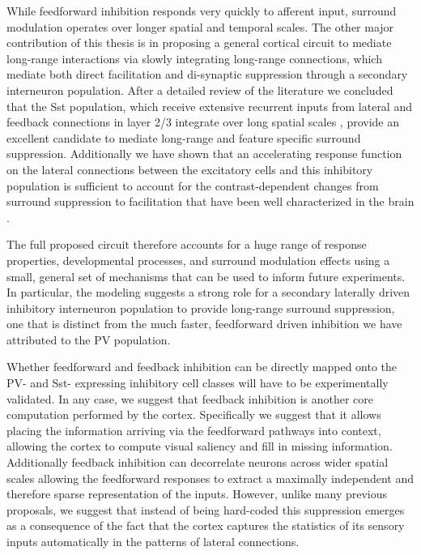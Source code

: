 While feedforward inhibition responds very quickly to afferent input,
surround modulation operates over longer spatial and temporal
scales. The other major contribution of this thesis is in proposing a
general cortical circuit to mediate long-range interactions via slowly
integrating long-range connections, which mediate both direct
facilitation and di-synaptic suppression through a secondary
interneuron population. After a detailed review of the literature we
concluded that the Sst population, which receive extensive recurrent
inputs from lateral and feedback connections in layer 2/3 integrate
over long spatial scales \citep{Xu2009, Adesnik2012, Nienborg2013},
provide an excellent candidate to mediate long-range and feature
specific surround suppression. Additionally we have shown that an
accelerating response function on the lateral connections between the
excitatory cells and this inhibitory population is sufficient to
account for the contrast-dependent changes from surround suppression
to facilitation that have been well characterized in the brain
\citep{Levitt1997, Polat1998, Dragoi2000, Wang2009}.

The full proposed circuit therefore accounts for a huge range of
response properties, developmental processes, and surround modulation
effects using a small, general set of mechanisms that can be used to
inform future experiments. In particular, the modeling suggests a
strong role for a secondary laterally driven inhibitory interneuron
population to provide long-range surround suppression, one that is
distinct from the much faster, feedforward driven inhibition we have
attributed to the PV population.

Whether feedforward and feedback inhibition can be directly mapped
onto the PV- and Sst- expressing inhibitory cell classes will have to
be experimentally validated.  In any case, we suggest that feedback
inhibition is another core computation performed by the
cortex. Specifically we suggest that it allows placing the information
arriving via the feedforward pathways into context, allowing the
cortex to compute visual saliency and fill in missing
information. Additionally feedback inhibition can decorrelate neurons
across wider spatial scales allowing the feedforward responses to
extract a maximally independent and therefore sparse representation of
the inputs. However, unlike many previous proposals, we suggest that
instead of being hard-coded this suppression emerges as a consequence
of the fact that the cortex captures the statistics of its sensory
inputs automatically in the patterns of lateral connections.

